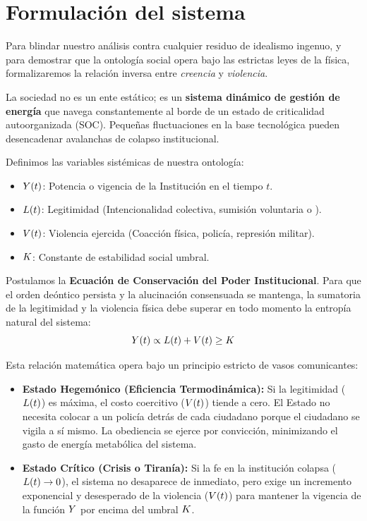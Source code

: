 \section{Formulación del sistema}
\label{sec:lab_termodinamica_poder}

Para blindar nuestro análisis contra cualquier residuo de idealismo ingenuo, y para demostrar que la ontología social opera bajo las estrictas leyes de la física, formalizaremos la relación inversa entre \textit{creencia} y \textit{violencia}. 

La sociedad no es un ente estático; es un \textbf{sistema dinámico de gestión de energía} que navega constantemente al borde de un estado de criticalidad autoorganizada (SOC). Pequeñas fluctuaciones en la base tecnológica pueden desencadenar avalanchas de colapso institucional.

Definimos las variables sistémicas de nuestra ontología:
\begin{itemize}
    \item $Y(t)$: Potencia o vigencia de la Institución en el tiempo $t$.
    \item $L(t)$: Legitimidad (Intencionalidad colectiva, sumisión voluntaria o \Habitus).
    \item $V(t)$: Violencia ejercida (Coacción física, policía, represión militar).
    \item $K$: Constante de estabilidad social umbral.
\end{itemize}

Postulamos la \textbf{Ecuación de Conservación del Poder Institucional}. Para que el orden deóntico persista y la alucinación consensuada se mantenga, la sumatoria de la legitimidad y la violencia física debe superar en todo momento la entropía natural del sistema:
\begin{equation}
    Y(t) \propto L(t) + V(t) \ge K
\end{equation}

Esta relación matemática opera bajo un principio estricto de vasos comunicantes:
\begin{itemize}
    \item \textbf{Estado Hegemónico (Eficiencia Termodinámica):} Si la legitimidad ($L(t)$) es máxima, el costo coercitivo ($V(t)$) tiende a cero. El Estado no necesita colocar a un policía detrás de cada ciudadano porque el ciudadano se vigila a sí mismo. La obediencia se ejerce por convicción, minimizando el gasto de energía metabólica del sistema.
    \item \textbf{Estado Crítico (Crisis o Tiranía):} Si la fe en la institución colapsa ($L(t) \to 0$), el sistema no desaparece de inmediato, pero exige un incremento exponencial y desesperado de la violencia ($V(t)$) para mantener la vigencia de la función $Y$ por encima del umbral $K$. 
\end{itemize}

